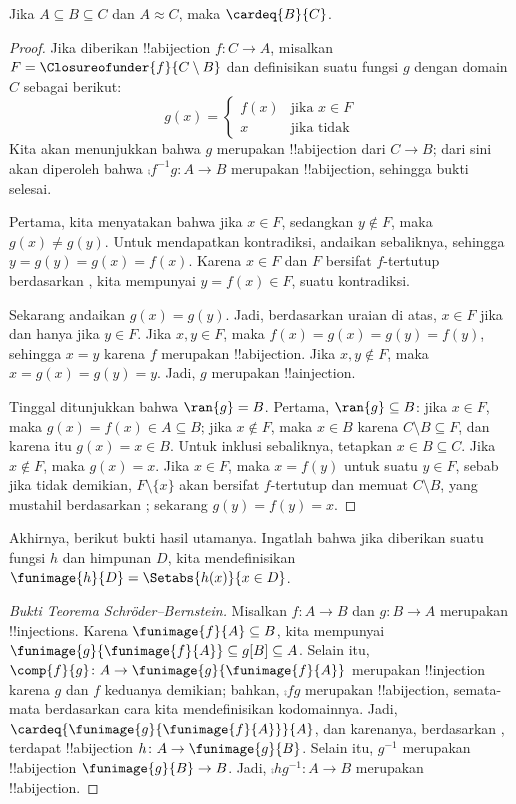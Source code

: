 \documentclass[../../../include/open-logic-section]{subfiles}
\begin{document}
\begin{prop}
Jika $A \subseteq B \subseteq C$ dan $A \approx C$, maka $\cardeq{B}{C}$.
\end{prop}

\begin{proof}
Jika diberikan !!a{bijection} $f \colon C \to A$, misalkan $F =
\Closureofunder{f}{C \setminus B}$ dan definisikan suatu fungsi $g$ dengan
domain $C$ sebagai berikut:
\[
	g(x) =
	\begin{cases}
			f(x) &\text{jika $x \in F$}\\
			x & \text{jika tidak}
	\end{cases}
\]
Kita akan menunjukkan bahwa $g$ merupakan !!a{bijection} dari $C \to B$;
dari sini akan diperoleh bahwa $\comp{f^{-1}}{g} \colon A \to B$ merupakan
!!a{bijection}, sehingga bukti selesai.

Pertama, kita menyatakan bahwa jika $x \in F$, sedangkan $y\notin F$, maka
$g(x) \neq g(y)$. Untuk mendapatkan kontradiksi, andaikan sebaliknya,
sehingga $y = g(y) = g(x) = f(x)$. Karena $x \in F$ dan $F$ bersifat
$f$-tertutup berdasarkan , kita mempunyai
$y = f(x) \in F$, suatu kontradiksi.

Sekarang andaikan $g(x) = g(y)$. Jadi, berdasarkan uraian di atas, $x \in F$
jika dan hanya jika $y \in F$. Jika $x, y \in F$, maka
$f(x) = g (x) = g(y) = f(y)$, sehingga $x = y$ karena $f$ merupakan
!!a{bijection}. Jika $x, y \notin F$, maka $x = g(x) = g(y) = y$. Jadi,
$g$ merupakan !!a{injection}.

Tinggal ditunjukkan bahwa $\ran{g} = B$. Pertama,
$\ran{g} \subseteq B$: jika $x \in F$, maka $g(x)=f(x) \in A \subseteq B$;
jika $x \notin F$, maka $x \in B$ karena $C\setminus B \subseteq F$, dan
karena itu $g(x)=x \in B$. Untuk inklusi sebaliknya, tetapkan
$x \in B \subseteq C$. Jika $x \notin F$, maka $g(x) = x$. Jika $x \in F$,
maka $x = f(y)$ untuk suatu $y \in F$, sebab jika tidak demikian,
$F \setminus \{x\}$ akan bersifat $f$-tertutup dan memuat
$C\setminus B$, yang mustahil berdasarkan ; sekarang
$g(y) = f(y) = x$.
\end{proof}

Akhirnya, berikut bukti hasil utamanya. Ingatlah bahwa jika diberikan suatu
fungsi $h$ dan himpunan $D$, kita mendefinisikan
$\funimage{h}{D} = \Setabs{h(x)}{x \in D}$.

\begin{proof}[Bukti Teorema Schr\"oder--Bernstein] Misalkan
$f \colon A \to B$ dan $g \colon B \to A$ merupakan !!{injection}s. Karena
$\funimage{f}{A} \subseteq B$, kita mempunyai
$\funimage{g}{\funimage{f}{A}} \subseteq g[B] \subseteq A$. Selain itu,
$\comp{f}{g} \colon A \to \funimage{g}{\funimage{f}{A}}$ merupakan
!!{injection} karena $g$ dan $f$ keduanya demikian; bahkan,
$\comp{f}{g}$ merupakan !!a{bijection}, semata-mata berdasarkan cara kita
mendefinisikan kodomainnya. Jadi,
$\cardeq{\funimage{g}{\funimage{f}{A}}}{A}$, dan karenanya, berdasarkan
, terdapat !!a{bijection} $h \colon A \to
\funimage{g}{B}$. Selain itu, $g^{-1}$ merupakan !!a{bijection}
$\funimage{g}{B} \to B$. Jadi, $\comp{h}{g^{-1}} \colon A \to B$ merupakan
!!a{bijection}.
\end{proof}
\end{document}
